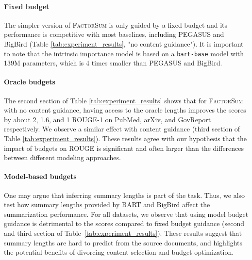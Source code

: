 \documentclass[11pt,table]{article}
\newcommand{\modelname}{FactorSum}
\begin{document}
\paragraph{Fixed budget}
The simpler version of \textsc{\modelname} is only guided by a fixed budget and its performance is competitive with most baselines, including PEGASUS and BigBird (Table \ref{tab:experiment_results}, "no content guidance"). It is important to note that the intrinsic importance model is based on a \texttt{bart-base} model with 139M parameters, which is 4 times smaller than PEGASUS and BigBird.

\paragraph{Oracle budgets} 
The second section of Table \ref{tab:experiment_results} shows that for \textsc{\modelname} with no content guidance, having access to the oracle lengths improves the scores by about 2, 1.6, and 1 ROUGE-1 on PubMed, arXiv, and GovReport respectively. We observe a similar effect with content guidance (third section of Table \ref{tab:experiment_results}). These results agree with our hypothesis that the impact of budgets on ROUGE is significant and often larger than the differences between different modeling approaches.

\paragraph{Model-based budgets} 
One may argue that inferring summary lengths is part of the task. Thus, we also test how summary lengths provided by BART and BigBird affect the summarization performance. For all datasets, we observe that using model budget guidance is detrimental to the scores compared to fixed budget guidance (second and third section of Table~\ref{tab:experiment_results}). These results suggest that summary lengths are hard to predict from the source documents, and highlights the potential benefits of divorcing content selection and budget optimization.
\end{document}
